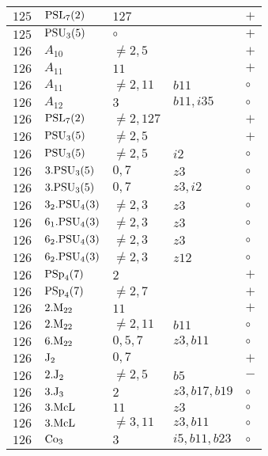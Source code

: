 \documentclass[a4paper, 11pt]{article}
\begin{document}
\begin{longtable}{lllll}
		$125$ & ${\rm PSL}_{7}(2)$ & $127$ &  & $+$ \\ \hline
		$125$ & ${\rm PSU}_{3}(5)$ & $\circ$ &  & $+$ \\ \hline
		$126$ & $A_{10}$ & $\neq 2,5$ &  & $+$ \\ \hline
		$126$ & $A_{11}$ & $11$ &  & $+$ \\ \hline
		$126$ & $A_{11}$ & $\neq 2,11$ & $b11$ & $\circ$ \\ \hline
		$126$ & $A_{12}$ & $3$ & $b11,i35$ & $\circ$ \\ \hline
		$126$ & ${\rm PSL}_{7}(2)$ & $\neq 2,127$ &  & $+$ \\ \hline
		$126$ & ${\rm PSU}_{3}(5)$ & $\neq 2,5$ &  & $+$ \\ \hline
		$126$ & ${\rm PSU}_{3}(5)$ & $\neq 2,5$ & $i2$ & $\circ$ \\ \hline
		$126$ & $3.{\rm PSU}_{3}(5)$ & $0,7$ & $z3$ & $\circ$ \\ \hline
		$126$ & $3.{\rm PSU}_{3}(5)$ & $0,7$ & $z3, i2$ & $\circ$ \\ \hline
		$126$ & $3_2.{\rm PSU}_{4}(3)$ & $\neq 2,3$ & $z3$ & $\circ$ \\ \hline
		$126$ & $6_1.{\rm PSU}_{4}(3)$ & $\neq 2,3$ & $z3$ & $\circ$ \\ \hline
		$126$ & $6_2.{\rm PSU}_{4}(3)$ & $\neq 2,3$ & $z3$ & $\circ$ \\ \hline
		$126$ & $6_2.{\rm PSU}_{4}(3)$ & $\neq 2,3$ & $z12$ & $\circ$ \\ \hline
		$126$ & ${\rm PSp}_{4}(7)$ & $2$ &  & $+$ \\ \hline
		$126$ & ${\rm PSp}_{4}(7)$ & $\neq 2,7$ &  & $+$ \\ \hline
		$126$ & $2.{\rm M}_{22}$ & $11$ &  & $+$ \\ \hline
		$126$ & $2.{\rm M}_{22}$ & $\neq 2,11$ & $b11$ & $\circ$ \\ \hline
		$126$ & $6.{\rm M}_{22}$ & $0, 5, 7$ & $z3, b11$ & $\circ$ \\ \hline
		$126$ & ${\rm J}_2$ & $0,7$ &  & $+$ \\ \hline
		$126$ & $2.{\rm J}_2$ & $\neq 2,5$ & $b5$ & $-$ \\ \hline
		$126$ & $3.{\rm J}_3$ & $2$ & $z3, b17, b19$ & $\circ$ \\ \hline
		$126$ & $3.{\rm McL}$ & $11$ & $z3$ & $\circ$ \\ \hline
		$126$ & $3.{\rm McL}$ & $\neq 3,11$ & $z3, b11$ & $\circ$ \\ \hline
		$126$ & ${\rm Co}_{3}$ & $3$ & $i5, b11, b23$ & $\circ$ \\ \hline

\end{longtable}
\end{document}
